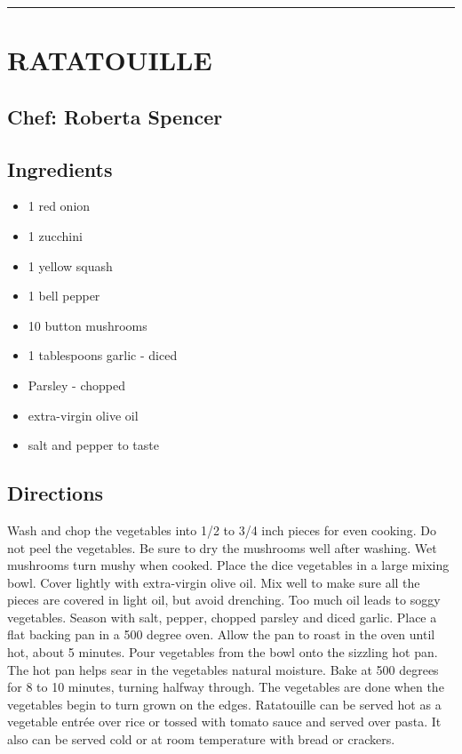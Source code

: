 \documentclass[
]{book}
\providecommand{\tightlist}{%
  \setlength{\itemsep}{0pt}\setlength{\parskip}{0pt}}
\begin{document}
\begin{center}\rule{0.5\linewidth}{0.5pt}\end{center}

\hypertarget{ratatouille}{%
\section*{RATATOUILLE}\label{ratatouille}}


\hypertarget{chef-roberta-spencer-10}{%
\subsection*{Chef: Roberta Spencer}\label{chef-roberta-spencer-10}}


\hypertarget{ingredients-36}{%
\subsection*{Ingredients}\label{ingredients-36}}


\begin{itemize}
\tightlist
\item
  1 red onion
\item
  1 zucchini
\item
  1 yellow squash
\item
  1 bell pepper
\item
  10 button mushrooms
\item
  1 tablespoons garlic - diced
\item
  Parsley - chopped
\item
  extra-virgin olive oil
\item
  salt and pepper to taste
\end{itemize}

\hypertarget{directions-36}{%
\subsection*{Directions}\label{directions-36}}


Wash and chop the vegetables into 1/2 to 3/4 inch pieces for even cooking.
Do not peel the vegetables. Be sure to dry the mushrooms well after washing.
Wet mushrooms turn mushy when cooked. Place the dice vegetables in a large mixing bowl.
Cover lightly with extra-virgin olive oil. Mix well to make sure all the pieces are covered in
light oil, but avoid drenching. Too much oil leads to soggy vegetables. Season with salt, pepper,
chopped parsley and diced garlic. Place a flat backing pan in a 500 degree oven.
Allow the pan to roast in the oven until hot, about 5 minutes. Pour vegetables from the bowl onto
the sizzling hot pan. The hot pan helps sear in the vegetables natural moisture. Bake at 500 degrees
for 8 to 10 minutes, turning halfway through. The vegetables are done when the vegetables begin to turn grown on the edges.
Ratatouille can be served hot as a vegetable entrée over rice or tossed with
tomato sauce and served over pasta. It also can be served cold or at room temperature with bread or crackers.
\end{document}
